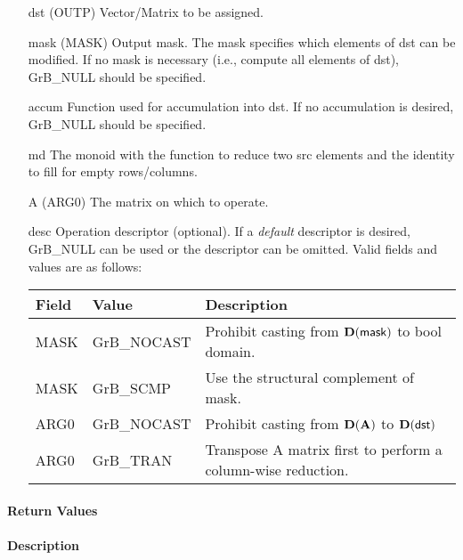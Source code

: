 \begin{itemize}[leftmargin=1.1in]
    \item[{\sf dst}]   ({\sf OUTP}) Vector/Matrix to be assigned.

    \item[{\sf mask}] ({\sf MASK}) Output mask. The mask specifies which elements
    of {\sf dst} can be modified. If no mask is necessary (i.e., compute all
    elements of {\sf dst}), {\sf GrB\_NULL} should be specified.

    \item[{\sf accum}] Function used for accumulation into {\sf dst}.  If no accumulation
                        is desired, {\sf GrB\_NULL} should be specified.

    \item[{\sf md}]    The monoid with the function to reduce two src elements and the identity to fill for empty rows/columns. 
    \item[{\sf A}]     ({\sf ARG0}) The matrix on which to operate.

    \item[{\sf desc}]   Operation descriptor (optional). If a
    \emph{default} descriptor is desired, {\sf GrB\_NULL} can be
    used or the descriptor can be omitted.  Valid fields and values are as follows: \\
    \begin{tabular}{lll}
    Field  & Value & Description \\
    \hline
    {\sf MASK} & {\sf GrB\_NOCAST} & Prohibit casting from $\bold{D}({\sf mask})$ to {\sf bool} domain. \\
    {\sf MASK} & {\sf GrB\_SCMP} & Use the structural complement of {\sf mask}. \\
    {\sf ARG0} & {\sf GrB\_NOCAST} & Prohibit casting from $\bold{D}({\bf A})$ to $\bold{D}({\sf dst})$ \\
    {\sf ARG0} & {\sf GrB\_TRAN} & Transpose {\sf A} matrix first to perform a 
    column-wise reduction. \\
    \end{tabular}

\end{itemize}

\paragraph{Return Values}

\paragraph{Description}

